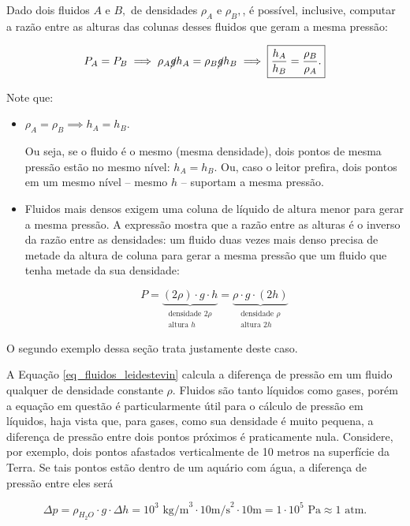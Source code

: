 Dado dois fluidos $A$ e $B,$ de densidades $\rho_A$ e $\rho_B,$, é possível, inclusive, computar a razão entre as alturas das colunas desses fluidos que geram a mesma pressão:

$$ P_A = P_B \implies \rho_A \cancel g h_A = \rho_B \cancel g h_B \implies \boxed{ \dfrac{h_A}{h_B} = \dfrac{\rho_B}{\rho_A}.}  $$

Note que:

\begin{itemize}
    \item [(i)] $ \rho_A = \rho_B \implies h_A = h_B$. 

    Ou seja, se o fluido é o mesmo (mesma densidade), dois pontos de mesma pressão estão no mesmo nível: $h_A=h_B.$ Ou, caso o leitor prefira, dois pontos em um mesmo nível -- mesmo $h$ -- suportam a mesma pressão.

     \item [(ii)] Fluidos mais densos exigem uma coluna de líquido de altura menor para gerar a mesma pressão. A expressão mostra que a razão entre as alturas é o inverso da razão entre as densidades: um fluido duas vezes mais denso precisa de metade da altura de coluna para gerar a mesma pressão que um fluido que tenha metade da sua densidade:

\[
P=
\underbrace{(2\rho)\cdot g \cdot h}_{\substack{\text{densidade }2\rho\\ \text{altura }h}}
=
\underbrace{\rho\cdot g \cdot(2 h)}_{\substack{\text{densidade }\rho\\ \text{altura }2h}}
\]


\end{itemize}

O segundo exemplo dessa seção trata justamente deste caso.





A  Equação \eqref{eq_fluidos_leidestevin} calcula a diferença de pressão em um fluido qualquer de densidade constante $\rho$.
 Fluidos são tanto líquidos como gases, porém a equação em questão é particularmente útil para o cálculo de pressão em líquidos, haja vista que, para gases, como sua densidade é muito pequena, a diferença de pressão entre dois pontos próximos é praticamente nula. Considere, por exemplo, dois pontos afastados verticalmente de 10 metros na superfície da Terra. Se tais pontos estão dentro de um aquário com água, a diferença de pressão entre eles será

 $$ \Delta p = \rho_{H_2 O} \cdot g \cdot \Delta h  = 10^3 \text{ kg/m}^3 \cdot 10 \text{m/s}^2 \cdot 10 \text{m} = 1 \cdot 10^5 \text{ Pa} \approx 1 \text{ atm.}$$

